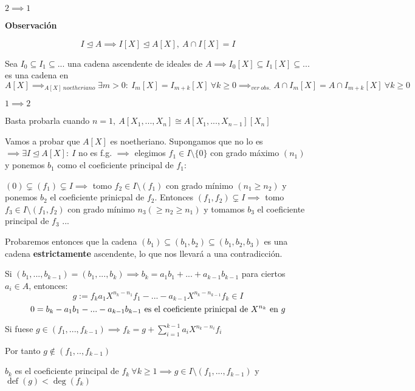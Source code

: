 \documentclass[openany]{book}
\begin{document}
\begin{demonstration}
    $ 2\implies 1 $
    \begin{flushright}
        \textbf{Observación}
    \end{flushright}

    $$ I \unlhd A \implies I[X] \unlhd A[X],\ A \cap I[X] = I $$

    Sea $ I_0 \subseteq I_1 \subseteq ...  $ una cadena ascendente de ideales de $ A \implies I_0[X] \subseteq I_1[X] \subseteq ... $ es una cadena en $ A[X] \implies_{A[X]\ noetheriano} \exists m>0 :\ I_{m}[X] = I_{m+k}[X]\ \forall k\geq  0 \implies_{ver\ obs.} A \cap I_{m}[X] = A \cap I_{m+k}[X]\ \forall k \geq  0$ 
    
    \noindent$ 1 \implies 2 $

    Basta probarla cuando $ n = 1,\ A[X_1,...,X_n] \cong A[X_1,...,X_{n-1}][X_n] $

    Vamos a probar que $ A[X] $ es noetheriano. Supongamos que no lo es $ \implies \exists I \unlhd A[X]:\ I $ no es f.g. $ \implies $ elegimos $ f_{1} \in I \setminus \{0\} $ con grado máximo $ (n_1) $ y ponemos $ b_1$ como el coeficiente principal de $ f_{1} $:

    $ (0) \subsetneq (f_{1}) \subsetneq I \implies $ tomo $ f_{2} \in I \setminus (f_{1})$ con grado mínimo $ (n_1 \geq  n_2)  $ y ponemos $ b_2  $ el coeficiente prinicpal de $ f_{2} $. Entonces $ (f_{1},f_{2}) \subsetneq I \implies  $ tomo $ f_{3} \in I \setminus (f_{1},f_{2}) $ con grado mínimo $ n_3 (\geq  n_2 \geq  n_1) $ y tomamos $ b_3$ el coeficiente principal de $ f_{3} $ ...

    Probaremos entonces que la cadena $ (b_1) \subseteq (b_1,b_2) \subseteq (b_1,b_2,b_3) $ es una cadena \textbf{estrictamente} ascendente, lo que nos llevará a una contradicción.

    Si $ (b_1,...,b_{k-1}) = (b_1,...,b_{k})  \implies b_{k} = a_1b_1+...+a_{k-1}b_{k-1}$ para ciertos $ a_i \in A $, entonces:
    $$ g:= f_{k} a_1X^{n_{k}-n_1}f_{1} -...-a_{k-1}X^{n_{k}-n_{k-1}}f_{k} \in I $$
    $$ 0 = b_{k}-a_1b_1-...-a_{k-1}b_{k-1}  \text{ es el coeficiente prinicpal de $ X^{n_{k}} $ en $g  $} $$

    Si fuese $ g \in (f_{1},...,f_{k-1}) \implies f_{k} = g+ \sum\limits_{i=1}^{k-1} a_iX^{n_{k}-n_i}f_{i} $
    
    Por tanto $ g \not \in (f_{1},..,f_{k-1}) $

    $ b_{k} $ es el coeficiente principal de $ f_{k}\ \forall k\geq  1 \implies g \in I \setminus(f_{1},...,f_{k-1})$ y $ \operatorname{def}(g) < \operatorname{deg}(f_{k}) $
\end{demonstration}
\end{document}
